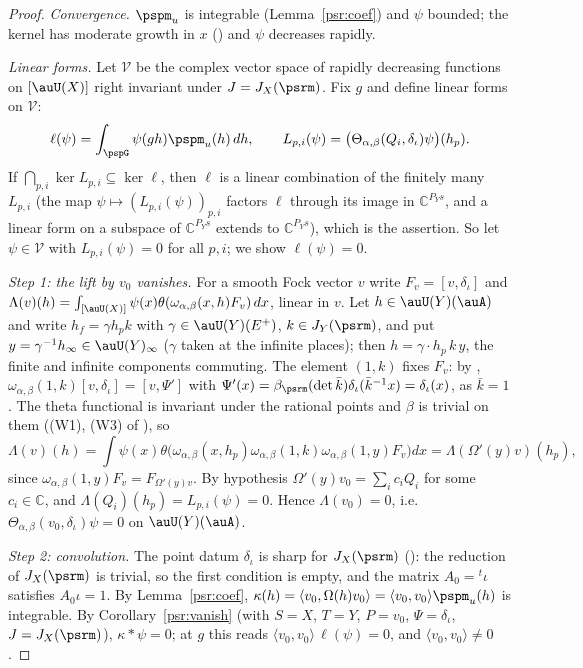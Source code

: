 \documentclass[10pt]{amsart}
\theoremstyle{definition}
\theoremstyle{remark}
\newcommand{\C}{\mathbb C}
\begin{document}
\begin{proof}
\emph{Convergence.} $\pspm_u$ is integrable (Lemma~\ref{psr:coef}) and $\psi$ bounded; the kernel has
moderate growth in $x$ ({\cite[Lemma~3.29]{P53}}) and $\psi$ decreases rapidly.

\emph{Linear forms.} Let $\mathcal V$ be the complex vector space of rapidly decreasing functions on
$[\auU(X)]$ right invariant under $J=J_X(\psrm)$. Fix $g$ and define linear forms on $\mathcal V$:
\[
\ell(\psi)=\int_{\pspG}\psi(gh)\pspm_u(h)\,dh,\qquad L_{p,i}(\psi)=\bigl(\Theta_{\alpha,\beta}(Q_i,
\delta_\iota)\psi\bigr)(h_p) .
\]
If $\bigcap_{p,i}\ker L_{p,i}\subseteq\ker\ell$, then $\ell$ is a linear combination of the finitely many
$L_{p,i}$ (the map $\psi\mapsto(L_{p,i}(\psi))_{p,i}$ factors $\ell$ through its image in $\C^{P_Ys}$, and a
linear form on a subspace of $\C^{P_Ys}$ extends to $\C^{P_Ys}$), which is the assertion. So let
$\psi\in\mathcal V$ with $L_{p,i}(\psi)=0$ for all $p,i$; we show $\ell(\psi)=0$.

\emph{Step 1: the lift by $v_0$ vanishes.} For a smooth Fock vector $v$ write $F_v=[v,\delta_\iota]$ and
$\Lambda(v)(h)=\int_{[\auU(X)]}\psi(x)\theta(\omega_{\alpha,\beta}(x,h)F_v)\,dx$, linear in $v$. Let
$h\in\auU(Y)(\auA)$ and write $h_f=\gamma h_pk$ with $\gamma\in\auU(Y)(E^+)$, $k\in J_Y(\psrm)$, and put
$y=\gamma^{-1}h_\infty\in\auU(Y)_\infty$ ($\gamma$ taken at the infinite places); then $h=\gamma\cdot
h_p\,k\,y$, the finite and infinite components commuting. The
element $(1,k)$ fixes $F_v$: by {\cite[Lemma~2.9]{P53}}, $\omega_{\alpha,\beta}(1,k)[v,\delta_\iota]=[v,\Psi']$
with $\Psi'(x)=\beta_\psrm(\det\bar k)\delta_\iota(\bar k^{-1}x)=\delta_\iota(x)$, as $\bar k=1$. The theta
functional is invariant under the rational points and $\beta$ is trivial on them ((W1), (W3) of
{\cite[Lemma~5.2]{P49}}), so
\[
\Lambda(v)(h)=\int\psi(x)\theta\bigl(\omega_{\alpha,\beta}(x,h_p)\omega_{\alpha,\beta}(1,k)
\omega_{\alpha,\beta}(1,y)F_v\bigr)dx=\Lambda(\Omega'(y)v)(h_p),
\]
since $\omega_{\alpha,\beta}(1,y)F_v=F_{\Omega'(y)v}$. By hypothesis $\Omega'(y)v_0=\sum_ic_iQ_i$ for some
$c_i\in\C$, and $\Lambda(Q_i)(h_p)=L_{p,i}(\psi)=0$. Hence $\Lambda(v_0)=0$, i.e.\
$\Theta_{\alpha,\beta}(v_0,\delta_\iota)\psi=0$ on $\auU(Y)(\auA)$.

\emph{Step 2: convolution.} The point datum $\delta_\iota$ is sharp for $J_X(\psrm)$
({\cite[Definition~2.15]{P53}}): the reduction of $J_X(\psrm)$ is trivial, so the first condition is empty,
and the matrix $A_0={}^t\iota$ satisfies $A_0\iota=1$. By Lemma~\ref{psr:coef},
$\kappa(h)=\langle v_0,\Omega(h)v_0\rangle=\langle v_0,v_0\rangle\pspm_u(h)$ is integrable. By
Corollary~\ref{psr:vanish} (with $S=X$, $T=Y$, $P=v_0$, $\Psi=\delta_\iota$, $J=J_X(\psrm)$),
$\kappa*\psi=0$; at $g$ this reads $\langle v_0,v_0\rangle\,\ell(\psi)=0$, and $\langle v_0,v_0\rangle\ne0$.
\end{proof}
\end{document}
